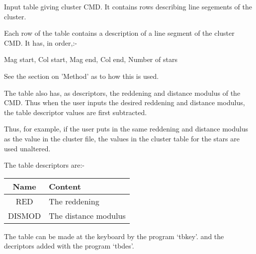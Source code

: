 \begin{small}
{{  Input table giving cluster CMD. It contains rows describing line
  segements of the cluster.
 
\begin{list}{{-}}{}
\item Each row of the table contains a description of a line segment of
      the cluster CMD. It has, in order,:-
 
      Mag start, Col start, Mag end, Col end, Number of stars
 
 
\item See the section on 'Method' as to how this is used.
 
 
\item The table also has, as descriptors, the reddening and distance modulus
      of the CMD. Thus when the user inputs the desired reddening and
      distance modulus, the table descriptor values are first subtracted.
 
      Thus, for example, if the user puts in the same reddening and distance
      modulus as the value in the cluster file, the values in the cluster
      table for the stars are used unaltered.
 
      The table descriptors are:-
 
\begin{tabular}{|c|l|}\hline
      Name   &  Content \\ \hline
      RED    &  The reddening \\
      DISMOD &  The distance modulus \\ \hline
\end{tabular}
 
\item The table can be made at the keyboard by the program `tbkey'.
      and the decriptors added with the program `tbdes'.
\end{list}
 
}}
\end{small}
